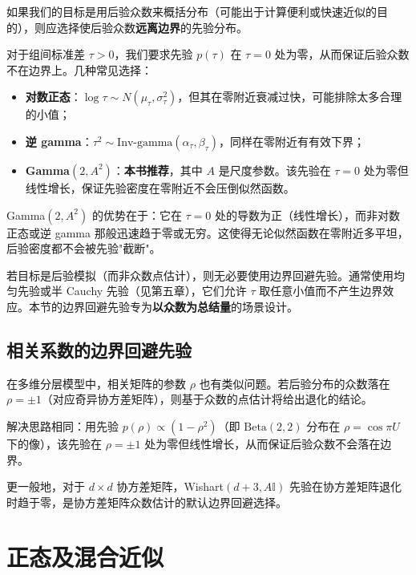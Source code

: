 如果我们的目标是用后验众数来概括分布（可能出于计算便利或快速近似的目的），则应选择使后验众数\textbf{远离边界}的先验分布。

对于组间标准差 $\tau > 0$，我们要求先验 $p(\tau)$ 在 $\tau = 0$ 处为零，从而保证后验众数不在边界上。几种常见选择：

\begin{itemize}
\item \textbf{对数正态}：$\log\tau \sim N(\mu_\tau, \sigma_\tau^2)$，但其在零附近衰减过快，可能排除太多合理的小值；
\item \textbf{逆 gamma}：$\tau^2 \sim \text{Inv-gamma}(\alpha_\tau, \beta_\tau)$，同样在零附近有有效下界；
\item \textbf{Gamma$(2, A^2)$}：\textbf{本书推荐}，其中 $A$ 是尺度参数。该先验在 $\tau = 0$ 处为零但线性增长，保证先验密度在零附近不会压倒似然函数。
\end{itemize}

Gamma$(2, A^2)$ 的优势在于：它在 $\tau = 0$ 处的导数为正（线性增长），而非对数正态或逆 gamma 那般迅速趋于零或无穷。这使得无论似然函数在零附近多平坦，后验密度都不会被先验"截断"。

\begin{Remark}[与全贝叶斯推断的对比]
若目标是后验模拟（而非众数点估计），则无必要使用边界回避先验。通常使用均匀先验或半 Cauchy 先验（见第五章），它们允许 $\tau$ 取任意小值而不产生边界效应。本节的边界回避先验专为\textbf{以众数为总结量}的场景设计。
\end{Remark}

\subsection{相关系数的边界回避先验}\label{sec:boundary-avoiding-correlation}

在多维分层模型中，相关矩阵的参数 $\rho$ 也有类似问题。若后验分布的众数落在 $\rho = \pm 1$（对应奇异协方差矩阵），则基于众数的点估计将给出退化的结论。

解决思路相同：用先验 $p(\rho) \propto (1-\rho^2)$（即 $\text{Beta}(2,2)$ 分布在 $\rho = \cos\pi U$ 下的像），该先验在 $\rho = \pm 1$ 处为零但线性增长，从而保证后验众数不会落在边界。

更一般地，对于 $d \times d$ 协方差矩阵，Wishart$(d+3, A\mathbb{I})$ 先验在协方差矩阵退化时趋于零，是协方差矩阵众数估计的默认边界回避选择。

\section{正态及混合近似}\label{sec:normal-approx}

